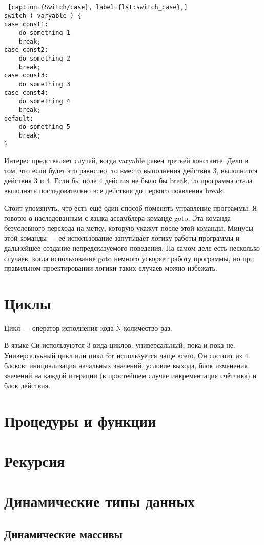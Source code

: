 \documentclass{bmstu}
\begin{document}
\begin{lstlisting} [caption={Switch/case}, label={lst:switch_case},]
switch ( varyable ) {
case const1:
    do something 1
    break;
case const2:
    do something 2
    break;
case const3:
    do something 3
case const4:
    do something 4
    break;        
default:
    do something 5
    break;
}
\end{lstlisting}

Интерес предстваляет случай, когда varyable равен третьей константе.
Дело в том, что если будет это равнство, то вместо выполнения действия 3, выполнится действия 3 и 4.
Если бы поле 4 дейстия не было бы break, то программа стала выполнять последовательно все действия до первого появления break.

Стоит упомянуть, что есть ещё один способ поменять управление программы.
Я говорю о наследованным с языка ассамблера команде goto.
Эта команда безусловного перехода на метку, которую укажут после этой команды.
Минусы этой команды --- её использование запутывает логику работы программы и дальнейшее создание непредсказуемого поведения.
На самом деле есть несколько случаев, когда использование goto немного ускоряет работу программы, но при правильном проектировании логики таких случаев можно избежать.

\section{Циклы}

Цикл --- оператор исполнения кода N количество раз.

В языке Си используются 3 вида циклов: универсальный, пока и пока не.
Универсалььный цикл или цикл for используется чаще всего.
Он состоит из 4 блоков: инициализация начальных значений, условие выхода, блок изменения значений на каждой итерации (в простейшем случае инкрементация счётчика) и блок действия.



\section{Процедуры и функции}
\section{Рекурсия}
\section{Динамические типы данных}
\subsection{Динамические массивы}
\end{document}
